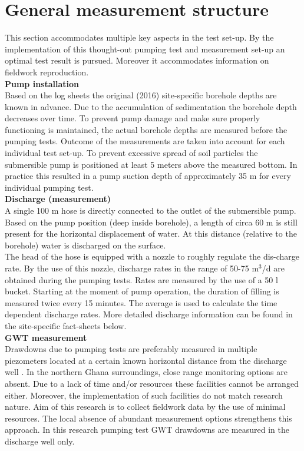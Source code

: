 \section{General measurement structure}
\label{section:measurement_structure}
This section accommodates multiple key aspects in the test set-up. By the implementation of this thought-out pumping test and measurement set-up an optimal test result is pursued. Moreover it accommodates information on fieldwork reproduction.
\bigskip \\
\textbf{Pump installation} \\
Based on the log sheets the original (2016) site-specific borehole depths are known in advance. Due to the accumulation of sedimentation the borehole depth decreases over time. To prevent pump damage and make sure properly functioning is maintained, the actual borehole depths are measured before the pumping tests. Outcome of the measurements are taken into account for each individual test set-up. To prevent excessive spread of soil particles the submersible pump is positioned at least 5 meters above the measured bottom. In practice this resulted in a pump suction depth of approximately 35 m for every individual pumping test.
\bigskip \\
\textbf{Discharge (measurement)} \\
A single 100 m hose is directly connected to the outlet of the submersible pump. Based on the pump position (deep inside borehole), a length of circa 60 m is still present for the horizontal displacement of water. At this distance (relative to the borehole) water is discharged on the surface.
\\
The head of the hose is equipped with a nozzle to roughly regulate the dis-charge rate. By the use of this nozzle, discharge rates in the range of 50-75 m$^{3}$/d are obtained during the pumping tests. Rates are measured by the use of a 50 l bucket. Starting at the moment of pump operation, the duration of filling is measured twice every 15 minutes. The average is used to calculate the time dependent discharge rates. More detailed discharge information can be found in the site-specific fact-sheets below.
\bigskip \\
\textbf{GWT measurement} \\
Drawdowns due to pumping tests are preferably measured in multiple piezometers located at a certain known horizontal distance from the discharge well \citep{Kruseman2000}. In the northern Ghana surroundings, close range monitoring options are absent. Due to a lack of time and/or resources these facilities cannot be arranged either. Moreover, the implementation of such facilities do not match research nature. Aim of this research is to collect fieldwork data by the use of minimal resources. The local absence of abundant measurement options strengthens this approach. In this research pumping test GWT drawdowns are measured in the discharge well only.\\
